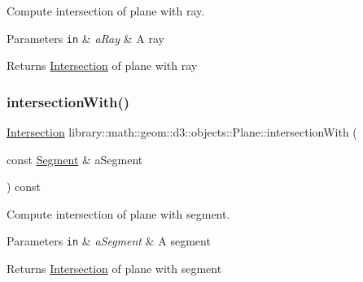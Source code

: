 Compute intersection of plane with ray. 


\begin{DoxyParams}[1]{Parameters}
\mbox{\tt in}  & {\em a\+Ray} & A ray \\
\hline
\end{DoxyParams}
\begin{DoxyReturn}{Returns}
\hyperlink{classlibrary_1_1math_1_1geom_1_1d3_1_1_intersection}{Intersection} of plane with ray 
\end{DoxyReturn}
\mbox{\label{classlibrary_1_1math_1_1geom_1_1d3_1_1objects_1_1_plane_a5ba133ab41625da978af467f9f909dc5}} 
\subsubsection{\texorpdfstring{intersection\+With()}{intersectionWith()}\hspace{0.1cm}{\footnotesize\ttfamily [5/5]}}
{\footnotesize\ttfamily \hyperlink{classlibrary_1_1math_1_1geom_1_1d3_1_1_intersection}{Intersection} library\+::math\+::geom\+::d3\+::objects\+::\+Plane\+::intersection\+With (\begin{DoxyParamCaption}\item[{const \hyperlink{classlibrary_1_1math_1_1geom_1_1d3_1_1objects_1_1_segment}{Segment} \&}]{a\+Segment }\end{DoxyParamCaption}) const}



Compute intersection of plane with segment. 


\begin{DoxyParams}[1]{Parameters}
\mbox{\tt in}  & {\em a\+Segment} & A segment \\
\hline
\end{DoxyParams}
\begin{DoxyReturn}{Returns}
\hyperlink{classlibrary_1_1math_1_1geom_1_1d3_1_1_intersection}{Intersection} of plane with segment 
\end{DoxyReturn}
\mbox{\label{classlibrary_1_1math_1_1geom_1_1d3_1_1objects_1_1_plane_a9b7ef78b47d1ba47dc87263ba143b0b5}} 
